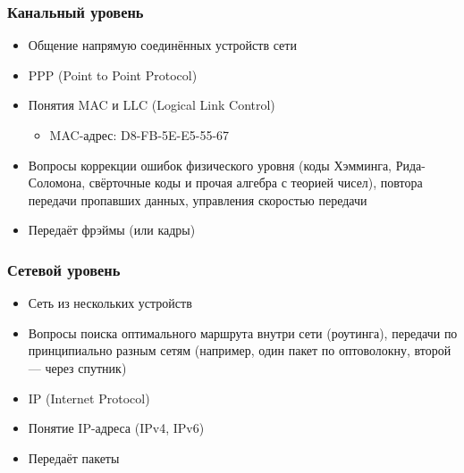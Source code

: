 \documentclass{../../slides-style}
\begin{document}
    \begin{frame}
        \frametitle{Канальный уровень}
        \begin{itemize}
            \item Общение напрямую соединённых устройств сети
            \item PPP (Point to Point Protocol)
            \item Понятия MAC и LLC (Logical Link Control)
            \begin{itemize}
                \item MAC-адрес: D8-FB-5E-E5-55-67
            \end{itemize}
            \item Вопросы коррекции ошибок физического уровня (коды Хэмминга, Рида-Соломона, свёрточные коды и прочая алгебра с теорией чисел), повтора передачи пропавших данных, управления скоростью передачи
            \item Передаёт фрэймы (или кадры)
        \end{itemize}
    \end{frame}

    \begin{frame}
        \frametitle{Сетевой уровень}
        \begin{itemize}
            \item Сеть из нескольких устройств
            \item Вопросы поиска оптимального маршрута внутри сети (роутинга), передачи по принципиально разным сетям (например, один пакет по оптоволокну, второй --- через спутник)
            \item IP (Internet Protocol)
            \item Понятие IP-адреса (IPv4, IPv6)
            \item Передаёт пакеты
        \end{itemize}
    \end{frame}
\end{document}
